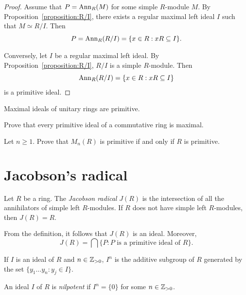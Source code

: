 \begin{proof}
	Assume that $P=\operatorname{Ann}_R(M)$ for some simple $R$-module $M$. By
	Proposition~\ref{proposition:R/I}, there exists a regular maximal 
	left ideal 
	$I$ such that $M\simeq R/I$. Then 
    \[
    P=\operatorname{Ann}_R(R/I)=\{x\in
	R:xR\subseteq I\}.
    \]

	Conversely, let $I$ be a regular maximal left ideal. By
	Proposition~\ref{proposition:R/I}, $R/I$ is a simple $R$-module. Then
	\[
	\operatorname{Ann}_R(R/I)=\{x\in R:xR\subseteq I\}
	\]
	is a primitive ideal.
\end{proof}

\begin{exercise}
\label{xca:maximal=>primitive}
    Maximal ideals of unitary rings are primitive.  
\end{exercise}

\begin{exercise}
\label{xca:primitive=>maximal}
	Prove that every primitive ideal of a commutative ring is maximal.
\end{exercise}

\begin{bonus}
\label{xca:M_n(R)primitive}
  Let $n\geq1$. 
    Prove that $M_n(R)$ is primitive if and only if $R$ is primitive.
\end{bonus}

\section{Jacobson's radical}
\lecture\label{lec:Jacobson}

\begin{definition}
\label{def:J}
Let $R$ be a ring. The \emph{Jacobson radical} $J(R)$
is the intersection of all the annihilators of simple left $R$-modules. If $R$ does not
have simple left $R$-modules, then $J(R)=R$. 
\end{definition}

From the definition, it follows
that $J(R)$ is an ideal. Moreover, 
	\[
		J(R)=\bigcap\{P:\text{$P$ is a primitive ideal of $R$}\}.
	\]

	If $I$ is an ideal of $R$ and $n\in\mathbb{Z}_{>0}$, $I^n$ is the additive subgroup of $R$ 
generated by the set $\{y_1\dots y_n:y_j\in I\}$. 

\begin{definition}
An ideal $I$ of $R$ is \emph{nilpotent} 
if $I^n=\{0\}$ for some $n\in\mathbb{Z}_{>0}$.
\end{definition}

